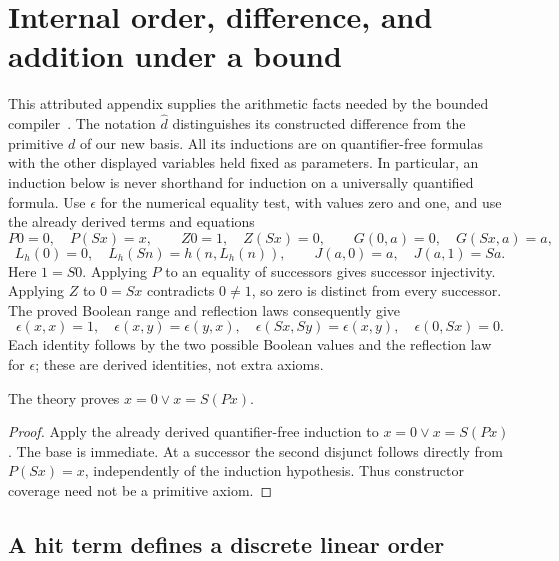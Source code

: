 
\section{Internal order, difference, and addition under a bound}
\label{sec:internal-order-foundations}

This attributed appendix supplies the arithmetic facts needed by the bounded compiler~\cite{bounded}. The notation $\widehat d$ distinguishes its constructed difference from the primitive $d$ of our new basis.
All its inductions are on quantifier-free formulas with the other displayed
variables held fixed as parameters.  In particular, an induction below is
never shorthand for induction on a universally quantified formula.  Use $\epsilon$ for the numerical equality test, with values zero and one, and use
the already derived terms and equations
\[
 P0=0,\quad P(Sx)=x,\qquad Z0=1,\quad Z(Sx)=0,
 \qquad G(0,a)=0,\quad G(Sx,a)=a,
\]
\[
 L_h(0)=0,\quad L_h(Sn)=h(n,L_h(n)),\qquad
 J(a,0)=a,\quad J(a,1)=Sa.
\]
Here $1=S0$.  Applying $P$ to an equality of successors gives successor
injectivity.  Applying $Z$ to $0=Sx$ contradicts $0\ne1$, so zero is
distinct from every successor.  The proved Boolean range and reflection laws consequently give
\[
 \epsilon(x,x)=1,\quad \epsilon(x,y)=\epsilon(y,x),\quad
 \epsilon(Sx,Sy)=\epsilon(x,y),\quad \epsilon(0,Sx)=0.
\]
Each identity follows by the two possible Boolean values and the reflection
law for $\epsilon$; these are derived identities, not extra axioms.

\begin{lemma}
\label{lem:internal-coverage}
The theory proves $x=0\lor x=S(Px)$.
\end{lemma}
\begin{proof}
Apply the already derived quantifier-free induction to
$x=0\lor x=S(Px)$.  The base is immediate.  At a successor the second
disjunct follows directly from $P(Sx)=x$, independently of the induction
hypothesis.  Thus constructor coverage need not be a primitive axiom.
\end{proof}

\subsection{A hit term defines a discrete linear order}

